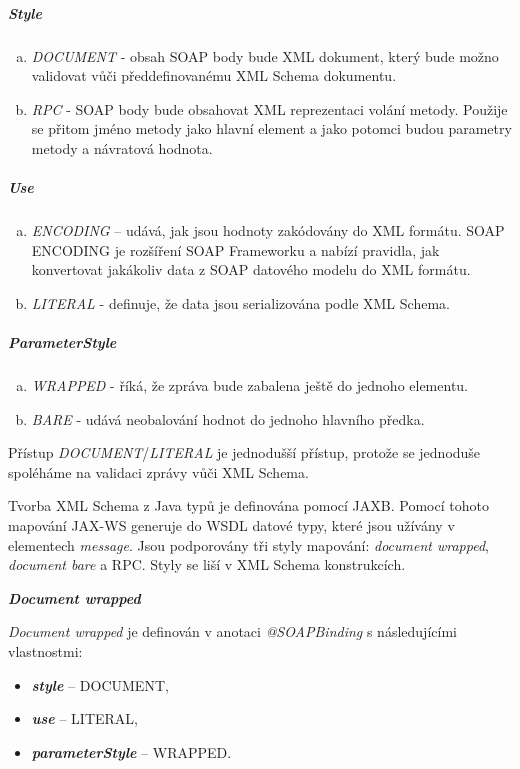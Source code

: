 \documentclass[11pt,twoside,a4paper]{book}
\begin{document}
\subparagraph{Style}
  	\begin{enumerate}[(a)]
  	  \item \textit{DOCUMENT} - obsah SOAP body bude XML dokument, který
  	  bude možno validovat vůči předdefinovanému XML Schema dokumentu.
  	  \item \textit{RPC} - SOAP body bude obsahovat XML reprezentaci volání
  	  metody.
Použije se přitom jméno metody jako hlavní element a jako potomci budou
parametry metody a návratová hodnota.
	\end{enumerate}
\subparagraph{Use}
	\begin{enumerate}[(a)]
	  \item \textit{ENCODING} – udává, jak jsou hodnoty zakódovány do XML
	  formátu.
SOAP ENCODING je rozšíření SOAP Frameworku a nabízí pravidla, jak
konvertovat jakákoliv data z SOAP datového modelu do XML formátu.
	  \item \textit{LITERAL} - definuje, že data jsou serializována podle
	  XML Schema.
	\end{enumerate}
\subparagraph{ParameterStyle}
	\begin{enumerate}[(a)]
	  \item \textit{WRAPPED} - říká, že zpráva bude zabalena ještě do
	  jednoho elementu.
	  \item \textit{BARE} - udává neobalování hodnot do jednoho hlavního
	  předka.
	\end{enumerate}

Přístup {\em DOCUMENT}/{\em LITERAL} je jednodušší přístup, protože se jednoduše
spoléháme na validaci zprávy vůči XML Schema.

Tvorba XML Schema z Java typů je definována pomocí JAXB. Pomocí tohoto mapování
JAX-WS generuje do WSDL datové typy, které jsou užívány v elementech {\em
message}. Jsou podporovány tři styly mapování: {\em document wrapped}, {\em
document bare} a RPC. Styly se liší v XML Schema konstrukcích.

\textbf{\textit{Document wrapped}}

{\em Document wrapped} je definován v anotaci {\em @SOAPBinding} s následujícími
vlastnostmi:

\begin{itemize}
  \item \textbf{\textit{style}} – DOCUMENT,
  \item \textbf{\textit{use}} – LITERAL,
  \item \textbf{\textit{parameterStyle}} – WRAPPED.
\end{itemize}
\end{document}
